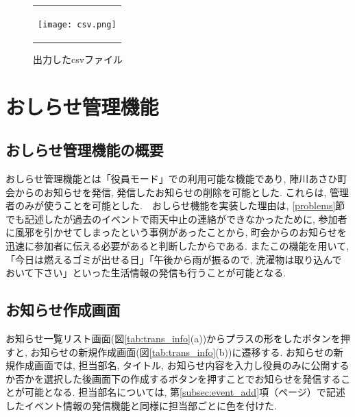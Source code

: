 \begin{figure}[htbp]
  \begin{center}
    \begin{tabular}{c}

      \begin{minipage}{0.7\hsize}
        \begin{center}
\texttt{[image: csv.png]}
          \hspace{1cm} %
        \end{center}
      \end{minipage}

    \end{tabular}
    \caption{出力したcsvファイル}
    \label{tab:csv}
  \end{center}
\end{figure}

\section{おしらせ管理機能}%
\subsection{おしらせ管理機能の概要}%
おしらせ管理機能とは「役員モード」での利用可能な機能であり, 陣川あさひ町会からのお知らせを発信, 発信したお知らせの削除を可能とした. これらは, 管理者のみが使うことを可能とした.　おしらせ機能を実装した理由は, \ref{problems}節でも記述したが過去のイベントで雨天中止の連絡ができなかったために, 参加者に風邪を引かせてしまったという事例があったことから, 町会からのお知らせを迅速に参加者に伝える必要があると判断したからである. またこの機能を用いて, 「今日は燃えるゴミが出せる日」「午後から雨が振るので, 洗濯物は取り込んでおいて下さい」といった生活情報の発信も行うことが可能となる.


\subsection{お知らせ作成画面}%
お知らせ一覧リスト画面(図\ref{tab:trans_info}(a))からプラスの形をしたボタンを押すと, お知らせの新規作成画面(図\ref{tab:trans_info}(b))に遷移する. お知らせの新規作成画面では, 担当部名, タイトル, お知らせ内容を入力し役員のみに公開するか否かを選択した後画面下の作成するボタンを押すことでお知らせを発信することが可能となる. 担当部名については, 第\ref{subsec:event_add}項（\pageref{subsec:event_add}ページ）で記述したイベント情報の発信機能と同様に担当部ごとに色を付けた.

